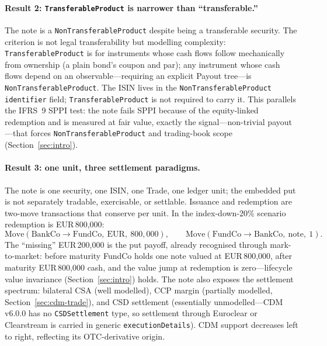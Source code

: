 \paragraph{Result 2: \texttt{Transferable\allowbreak Product} is narrower than ``transferable.''} The note is a \texttt{Non\allowbreak Transferable\allowbreak Product} despite being a transferable security. The criterion is not legal transferability but modelling complexity: \texttt{Transferable\allowbreak Product} is for instruments whose cash flows follow mechanically from ownership (a plain bond's coupon and par); any instrument whose cash flows depend on an observable---requiring an explicit Payout tree---is \texttt{Non\allowbreak Transferable\allowbreak Product}. The ISIN lives in the \texttt{Non\allowbreak Transferable\allowbreak Product} \texttt{identifier} field; \texttt{Transferable\allowbreak Product} is not required to carry it. This parallels the IFRS~9 SPPI test: the note fails SPPI because of the equity-linked redemption and is measured at fair value, exactly the signal---non-trivial payout---that forces \texttt{Non\allowbreak Transferable\allowbreak Product} and trading-book scope (Section~\ref{sec:intro}).

\paragraph{Result 3: one unit, three settlement paradigms.} The note is one security, one ISIN, one Trade, one ledger unit; the embedded put is not separately tradable, exercisable, or settlable. Issuance and redemption are two-move transactions that conserve per unit. In the index-down-20\% scenario redemption is EUR\,800{,}000:
\[
\text{Move}(\text{BankCo}\to\text{FundCo},\ \text{EUR},\ 800{,}000),\qquad
\text{Move}(\text{FundCo}\to\text{BankCo},\ \text{note},\ 1).
\]
The ``missing'' EUR\,200{,}000 is the put payoff, already recognised through mark-to-market: before maturity FundCo holds one note valued at EUR\,800{,}000, after maturity EUR\,800{,}000 cash, and the value jump at redemption is zero---lifecycle value invariance (Section~\ref{sec:intro}) holds. The note also exposes the settlement spectrum: bilateral CSA (well modelled), CCP margin (partially modelled, Section~\ref{sec:cdm-trade}), and CSD settlement (essentially unmodelled---CDM v6.0.0 has no \texttt{CSDSettlement} type, so settlement through Euroclear or Clearstream is carried in generic \texttt{executionDetails}). CDM support decreases left to right, reflecting its OTC-derivative origin.

